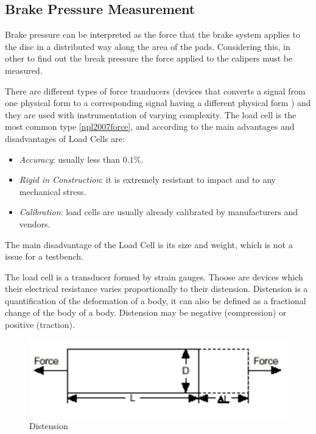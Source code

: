 \subsection{Brake Pressure Measurement}\label{ssec:load-cell}

	Brake pressure can be interpreted as the force that the brake system applies to the disc in a distributed way along the area of the pads. Considering this, in other to find out the break pressure the force applied to the calipers must be measured.
	\par
	There are different types of force tranducers (devices that converts a signal from one physical form to a corresponding signal having a different physical form \cite{palla2012sensors}) and they are used with instrumentation of varying complexity. The load cell is the most common type \ref{npl2007force}, and according to \cite{dillon1989load} the main advantages and disadvantages of Load Cells are: 

	\begin{itemize}
		\item \textit{Accuracy}: usually less than $0.1\%$.\label{itm:accuracy-load-cell}
		\item \textit{Rigid in Construction}: it is extremely resistant to impact and to any mechanical stress.\label{itm:rigid-load-cell}
		\item \textit{Calibration}: load cells are usually already calibrated by manufacturers and vendors.\label{itm:calibration-load-cell}
	\end{itemize}

	The main disadvantage of the Load Cell is its size and weight, which is not a issue for a testbench.
	\par
	The load cell is a transducer formed by strain gauges. Thoose are devices which their electrical resistance varies proportionally to their distension. Distension is a quantification of the deformation of a body, it can also be defined as a fractional change of the body of a body. Distension may be negative (compression) or positive (traction).

	\begin{figure}[htbp]
		\centering
			\includegraphics[scale=0.6]{figuras/fig-distension.png}
		\caption{Distension \cite{strain-def}}
		\label{fig:distension}
	\end{figure}

